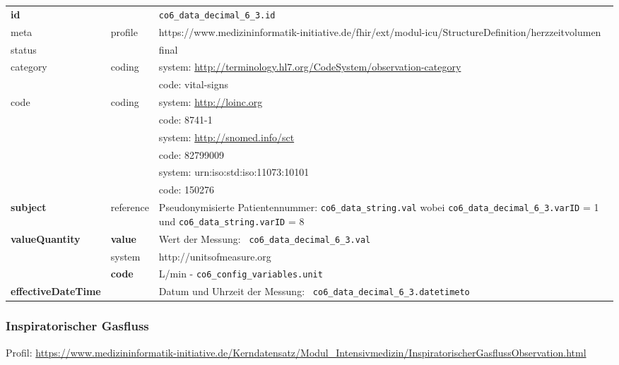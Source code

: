 \begin{longtable}{|l|l|p{7.5cm}|}
        \hline
        \rowcolor{lightgray} \multicolumn{3}{|l|}{Data Mapping (inhaltlich)} \\ \hline
        \textbf{id} &  & \texttt{co6\_data\_decimal\_6\_3.id} \\ \hline
	meta & profile & https://www.medizininformatik-initiative.de/fhir/ext/modul-icu/StructureDefinition/herzzeitvolumen \\ \hline 
	status &  & final   \\ \hline 
	category & coding & system: \url{http://terminology.hl7.org/CodeSystem/observation-category} \\
\cline{3-3}
	& & code: vital-signs \\ \hline
	code & coding & system: \url{http://loinc.org} \\ 
	\cline{3-3} 
	&  & code: 8741-1 \\ 
	\cline{3-3} 
	&  & system: \url{http://snomed.info/sct} \\ 
	\cline{3-3} 
	&  & code: 82799009 \\ 
	\cline{3-3} 
	&  & system: urn:iso:std:iso:11073:10101 \\ 
	\cline{3-3}
	&  & code: 150276 \\ \hline
	 \textbf{subject} & reference & Pseudonymisierte Patientennummer: \texttt{co6\_data\_string.val} wobei \texttt{co6\_data\_decimal\_6\_3.varID} = 1 und \texttt{co6\_data\_string.varID} = 8 \\ \hline
	 \textbf{valueQuantity}  & \textbf{value} & Wert der Messung: \texttt{
co6\_data\_decimal\_6\_3.val} \\
        \cline{2-3}
         & system & http://unitsofmeasure.org \\
         \cline{2-3}
         & \textbf{code} &
L/min - \texttt{co6\_config\_variables.unit}
\\ \hline
     \textbf{effectiveDateTime}  & & Datum und Uhrzeit der Messung: \texttt{
co6\_data\_decimal\_6\_3.datetimeto} \\
     \hline
\end{longtable}


\subsubsection{Inspiratorischer Gasfluss} 

Profil: \url{https://www.medizininformatik-initiative.de/Kerndatensatz/Modul_Intensivmedizin/InspiratorischerGasflussObservation.html}

